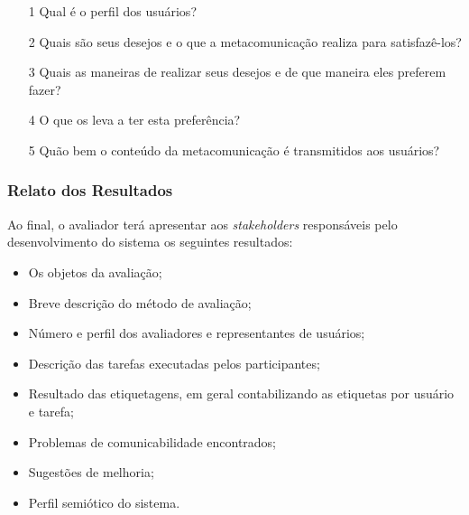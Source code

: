 \begin{itemize}
\item[1] Qual é o perfil dos usuários?
\item[2] Quais são seus desejos e o que a metacomunicação realiza para satisfazê-los?
\item[3] Quais as maneiras de realizar seus desejos e de que maneira eles preferem fazer?
\item[4] O que os leva a ter esta preferência?
\item[5] Quão bem o conteúdo da metacomunicação é transmitidos aos usuários?
\end{itemize}


\subsubsection{Relato dos Resultados}

\indent Ao final, o avaliador terá apresentar aos \textit{stakeholders} responsáveis pelo desenvolvimento do sistema os seguintes resultados:

\begin{itemize}
\item Os objetos da avaliação;
\item Breve descrição do método de avaliação;
\item Número e perfil dos avaliadores e representantes de usuários;
\item Descrição das tarefas executadas pelos participantes;
\item Resultado das etiquetagens, em geral contabilizando as etiquetas por usuário e tarefa;
\item Problemas de comunicabilidade encontrados;
\item Sugestões de melhoria;
\item Perfil semiótico do sistema.
\end{itemize}




